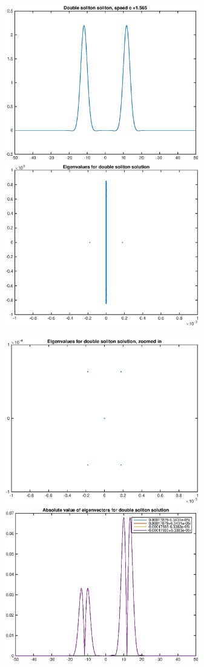 \documentclass[12pt]{article}
\begin{document}
\begin{enumerate}
\begin{figure}[H]
\includegraphics[width=8.5cm]{double2.eps}
\includegraphics[width=8.5cm]{double2eig.eps}
\end{figure}

\begin{figure}[H]
\includegraphics[width=8.5cm]{double2eigzoom.eps}
\includegraphics[width=8.5cm]{double2vecabs.eps}
\end{figure}


\end{enumerate}
\end{document}
